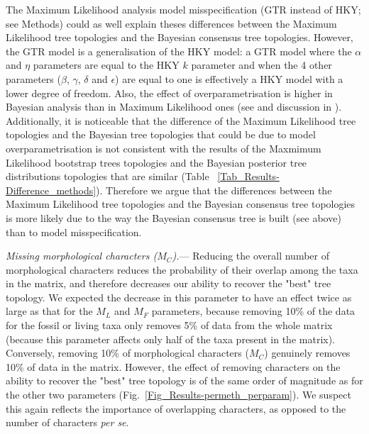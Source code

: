 \documentclass[12pt,letterpaper]{article}
\renewcommand{\subsubsection}[1]{%
\vspace{2ex}
\noindent
\textit{#1.}---}
\begin{document}
The Maximum Likelihood analysis model misspecification (GTR instead of HKY; see Methods) could as well explain theses differences between the Maximum Likelihood tree topologies and the Bayesian consensus tree topologies. However, the GTR model is a generalisation of the HKY model: a GTR model where the $\alpha$ and $\eta$ parameters are equal to the HKY $k$ parameter and when the 4 other parameters ($\beta$, $\gamma$, $\delta$ and $\epsilon$) are equal to one is effectively a HKY model with a lower degree of freedom. Also, the effect of overparametrisation is higher in Bayesian analysis than in Maximum Likelihood ones (see \citealt{Buckley01052002} and discussion in \citealt{douadycomparison2003}).
Additionally, it is noticeable that the difference of the Maximum Likelihood tree topologies and the Bayesian tree topologies that could be due to model overparametrisation is not consistent with the results of the Maxmimum Likelihood bootstrap trees topologies and the Bayesian posterior tree distributions topologies that are similar (Table ~\ref{Tab_Results-Difference_methods}). Therefore we argue that the differences between the Maximum Likelihood tree topologies and the Bayesian consensus tree topologies is more likely due to the way the Bayesian consensus tree is built (see above) than to model misspecification.

\subsubsection{Missing morphological characters ($M_{C}$)}
Reducing the overall number of morphological characters reduces the probability of their overlap among the taxa in the matrix, and therefore decreases our ability to recover the "best" tree topology. We expected the decrease in this parameter to have an effect twice as large as that for the $M_{L}$ and $M_{F}$ parameters, because removing 10\% of the data for the fossil or living taxa only removes 5\% of data from the whole matrix (because this parameter affects only half of the taxa present in the matrix). Conversely, removing 10\% of morphological characters ($M_{C}$) genuinely removes 10\% of data in the matrix. However, the effect of removing characters on the ability to recover the "best" tree topology is of the same order of magnitude as for the other two parameters (Fig.~\ref{Fig_Results-permeth_perparam}). We suspect this again reflects the importance of overlapping characters, as opposed to the number of characters \textit{per se}.
\end{document}
